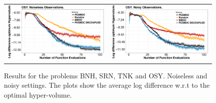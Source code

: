 \documentclass[review,preprint,12pt]{elsarticle}
\begin{document}
\begin{figure}[H]
\begin{tabular}{cc}
		\includegraphics[width=0.475\linewidth]{figures/benchmark/OSY.pdf} &
                \includegraphics[width=0.475\linewidth]{figures/benchmark/OSY_noisy.pdf} \\
        \end{tabular}
        \caption{Results for the problems BNH, SRN, TNK and OSY. Noiseless and noisy settings. The plots show 
		the average log difference w.r.t to the optimal hyper-volume.} 
        \label{fig:benchmark_results_1}
\end{figure}
\end{document}
